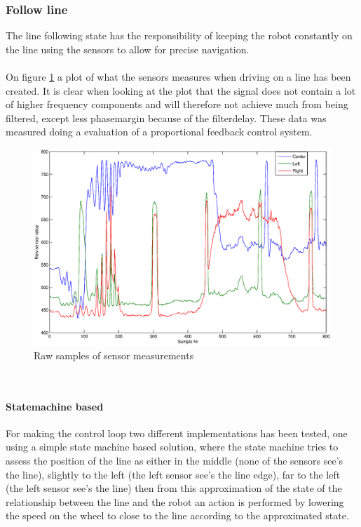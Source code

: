 \documentclass[draft, english, a4paper]{article}
\begin{document}
	    \subsubsection{Follow line}
	        The line following state has the responsibility of keeping the robot
		    constantly on the line using the sensors to allow for precise navigation.\\
		    \\
		    On figure \ref{fig:sensor_measurements} a plot of what the sensors
		    measures when driving on a line has been created. It is clear when
		    looking at the plot that the signal does not contain a lot of higher
		    frequency components and will therefore not achieve much from being filtered,
		    except less phasemargin because of the filterdelay. These data was measured
		    doing a evaluation of a proportional feedback control system.
		    \\
		    \begin{figure}[htp]
                \centering
    	        \includegraphics[scale=0.45]{sensor_measurements}
	            \caption{Raw samples of sensor measurements}\label{fig:sensor_measurements}
            \end{figure}
            \\
            \paragraph{Statemachine based}
            For making the control loop two different implementations has been
            tested, one using a simple state machine based solution, where the
            state machine tries to assess the position of the line as either 
            in the middle (none of the sensors see's the line), slightly to the left (the left sensor see's the
	         line edge), far to the left (the left sensor see's the line)
	        then from this approximation of the state of the relationship between
	        the line and the robot an action is performed by lowering the speed
	        on the wheel to close to the line according to the approximated state.\\
            \\
\end{document}
